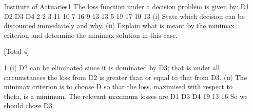 \documentclass[a4paper,12pt]{article}
\begin{document}
 


Institute of Actuaries1
The loss function under a decision problem is given by:
D1
D2
D3
D4
2
2 3
11
10
7
16 9
13
13
5 19
17
10
13
(i) State which decision can be discounted immediately and why.
(ii) Explain what is meant by the minimax criterion and determine the minimax
solution in this case.

[Total 4]


1
(i) D2 can be eliminated since it is dominated by D3; that is under all
circumstances the loss from D2 is greater than or equal to that from D3.
(ii) The minimax criterion is to choose D so that the loss, maximised with respect
to theta, is a minimum. The relevant maximum losses are
D1
D3
D4
19
13
16
So we should chose D3.
\end{document}
